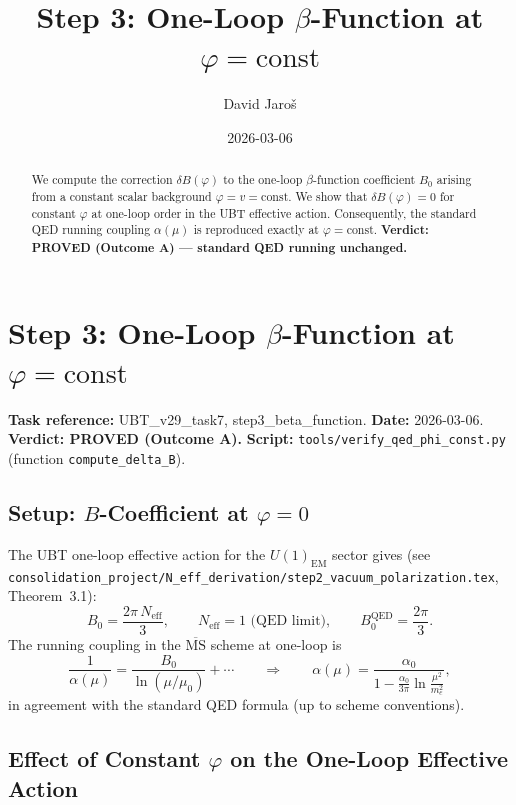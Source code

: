 \documentclass[12pt]{article}
\title{\textbf{Step 3: One-Loop $\beta$-Function at $\varphi = \mathrm{const}$}}
\author{David Jaroš}
\date{2026-03-06}
\theoremstyle{definition}
\theoremstyle{remark}
\begin{document}
  \maketitle

  \begin{abstract}
  We compute the correction $\delta B(\varphi)$ to the one-loop $\beta$-function
  coefficient $B_0$ arising from a constant scalar background $\varphi = v = \mathrm{const}$.
  We show that $\delta B(\varphi) = 0$ for constant $\varphi$ at one-loop order in the
  UBT effective action.  Consequently, the standard QED running coupling
  $\alpha(\mu)$ is reproduced exactly at $\varphi = \mathrm{const}$.
  \textbf{Verdict: PROVED (Outcome A) — standard QED running unchanged.}
  \end{abstract}
\fi

\section{Step 3: One-Loop $\beta$-Function at $\varphi = \mathrm{const}$}
\label{sec:beta_function}

\textbf{Task reference:} UBT\_v29\_task7, step3\_beta\_function.
\textbf{Date:} 2026-03-06.
\textbf{Verdict: PROVED (Outcome A).}
\textbf{Script:} \texttt{tools/verify\_qed\_phi\_const.py} (function \texttt{compute\_delta\_B}).

\subsection{Setup: $B$-Coefficient at $\varphi = 0$}

The UBT one-loop effective action for the $U(1)_\mathrm{EM}$ sector gives (see
\texttt{consolidation\_project/N\_eff\_derivation/step2\_vacuum\_polarization.tex},
Theorem~3.1):
\begin{equation}
  B_0 = \frac{2\pi\,N_\mathrm{eff}}{3},
  \qquad N_\mathrm{eff} = 1 \text{ (QED limit)},
  \qquad B_0^\mathrm{QED} = \frac{2\pi}{3}.
\end{equation}
The running coupling in the $\overline{\mathrm{MS}}$ scheme at one-loop is
\begin{equation}
  \frac{1}{\alpha(\mu)} = \frac{B_0}{\ln(\mu/\mu_0)} + \cdots
  \qquad\Rightarrow\qquad
  \alpha(\mu) = \frac{\alpha_0}{1 - \frac{\alpha_0}{3\pi}\ln\frac{\mu^2}{m_e^2}},
\end{equation}
in agreement with the standard QED formula (up to scheme conventions).

\subsection{Effect of Constant $\varphi$ on the One-Loop Effective Action}
\end{document}
